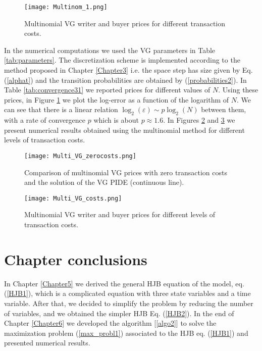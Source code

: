 \begin{figure}[t!]
  \centering
   \texttt{[image: Multinom\_1.png]}
   \caption{Multinomial VG writer and buyer prices for different transaction costs.}
   \label{Fig37}
\end{figure}  
In the numerical computations we used the VG parameters in Table \ref{tab:parameters}. 
The discretization scheme is implemented according to the method proposed in Chapter \ref{Chapter3} i.e. the space step has size given by Eq. (\ref{alphat}) and 
the transition probabilities are obtained by (\ref{probabilities2}). 
In Table \ref{tab:convergence31} we reported prices for different values of $N$.
Using these prices, in Figure \ref{Fig37} we plot the log-error as a function of the logarithm of $N$. We can see that there is a linear relation 
$\log_2(\varepsilon) \sim p \log_2(N)$ between them, with a rate of convergence $p$ which is about $p \approx 1.6$. 
In Figures \ref{Fig32} and \ref{Fig33} we present numerical results obtained using the multinomial method for different levels of transaction costs. 
\begin{figure}[t!]
   \centering
   \texttt{[image: Multi\_VG\_zerocosts.png]}
   \caption{Comparison of multinomial VG prices with zero transaction costs and the solution of the VG PIDE (continuous line).}
   \label{Fig32} 
\end{figure}
\begin{figure}[t!]
  \centering
   \texttt{[image: Multi\_VG\_costs.png]}
   \caption{Multinomial VG writer and buyer prices for different levels of transaction costs.}
   \label{Fig33}
\end{figure}  






\section{Chapter conclusions}


In Chapter \ref{Chapter5} we derived the general HJB equation of the model, eq. (\ref{HJB1}), which is 
a complicated equation with three state variables and a time variable. 
After that, we decided to simplify the problem by reducing the number of variables, and we obtained the simpler HJB Eq. (\ref{HJB2}).
In the end of Chapter \ref{Chapter6} we developed the algorithm [\ref{algo2}] to solve the maximization problem (\ref{max_probl1}) associated to the HJB eq. (\ref{HJB1})
and presented numerical results. 

